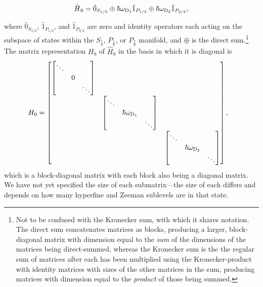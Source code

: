 \begin{align}
\hat H_0 = \hat 0_{S_{1/2}} \oplus
\hbar\omega_{\textsc{D}_1} \hat1_{P_{1/2}} \oplus
\hbar\omega_{\textsc{D}_2} \hat1_{P_{3/2}},
\end{align}

where $\hat 0_{S_{1/2}}$, $\hat1_{P_{1/2}}$, and $\hat1_{P_{3/2}}$ are zero and identity operators each acting on the subspace of states within the $S_{\frac12}$, $P_{\frac12}$, or $P_{\frac32}$ manifold, and $\oplus$ is the direct sum.\footnote{Not to be confused with the Kronecker sum, with which it shares notation. The direct sum concatenates matrices as blocks, producing a larger, block-diagonal matrix with dimension equal to the \emph{sum} of the dimensions of the matrices being direct-summed, whereas the Kronecker sum is the the regular sum of matrices after each has been multiplied using the Kronecker-product with identity matrices with sizes of the other matrices in the sum, producing matrices with dimension equal to the \emph{product} of those being summed.} The matrix representation $H_0$ of $\hat H_0$ in the basis in which it is diagonal is
\begin{align}
& H_0  = 
\left[\begin{matrix}
    \left[\begin{matrix}\ddots &&\\&0&\\&&\ddots\\\end{matrix} \right]\\
    & \left[\begin{matrix}\ddots &&\\&\hbar\omega_{\textsc{D}_1}&\\&&\ddots\\\end{matrix} \right]\\
    & &\left[\begin{matrix}\ddots &&\\&\hbar\omega_{\textsc{D}_2}&\\&&\ddots\\\end{matrix} \right]
\end{matrix} \right],
\end{align}
which is a block-diagonal matrix with each block also being a diagonal matrix. We have not yet specified the size of each submatrix---the size of each differs and depends on how many hyperfine and Zeeman sublevels are in that state.

